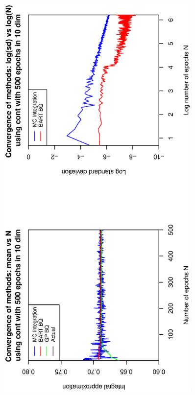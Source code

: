 \vspace{-0.5cm}
\begin{figure}[H]
  \centering
  \hspace{-1.6cm}
  \begin{minipage}[b]{0.4\textwidth}
    \includegraphics[width = 0.9\textwidth, angle = -90]{report/Figures/1/convergenceMean110Dimensions.eps}
     \vspace{-1.3cm}

\end{minipage}
\end{figure}
